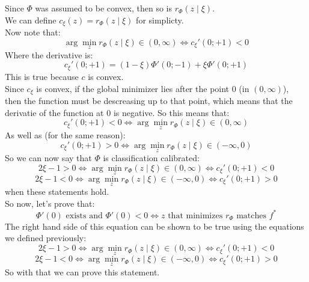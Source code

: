 \documentclass[12pt]{article}
\begin{document}
Since $\Phi$ was assumed to be convex,
then so is $r_\Phi(z \mid \xi)$. \\
We can define $c_\xi(z) = r_\Phi(z \mid \xi)$
for simplicty. \\

Now note that:
\[ \arg \min_z r_\Phi(z \mid \xi) \in (0, \infty)
\iff c_\xi'(0; +1) < 0 \]
Where the derivative is:
\[ c_\xi'(0; +1) 
= (1-\xi)\Phi'(0; -1) + \xi\Phi'(0; +1)\] 
This is true because $c$ is convex. \\
Since $c_\xi$ is convex,
if the global minimizer lies after the point $0$
(in $(0, \infty)$),
then the function must be descreasing
up to that point,
which means that the derivatie of the function
at $0$ is negative.
So this means that:
\[ c_\xi'(0; +1) < 0\iff 
\arg \min_z r_\Phi(z \mid \xi) \in (0, \infty) \]
As well as (for the same reason):
\[ c_\xi'(0; +1) > 0 \iff 
\arg \min_z r_\Phi(z \mid \xi) \in (-\infty, 0) \]
So we can now say that $\Phi$ is classification
calibrated:
\[ 2\xi - 1 > 0 \iff 
\arg \min_z r_\Phi(z \mid \xi) \in (0, \infty)
\iff c_\xi'(0; +1) < 0 \]
\[ 2\xi - 1 < 0 \iff 
\arg \min_z r_\Phi(z \mid \xi) \in (-\infty, 0)
\iff c_\xi'(0; +1) > 0 \]
when these statements hold. \\

So now, let's prove that:
\[ \Phi'(0) \text{ exists and } \Phi'(0) < 0
\iff z \text{ that minimizes } r_\Phi 
\text{ matches } f^* \]
The right hand side of this equation can be
shown to be true using the equations we defined previously:
\[ 2\xi - 1 > 0 \iff 
\arg \min_z r_\Phi(z \mid \xi) \in (0, \infty)
\iff c_\xi'(0; +1) < 0 \]
\[ 2\xi - 1 < 0 \iff 
\arg \min_z r_\Phi(z \mid \xi) \in (-\infty, 0)
\iff c_\xi'(0; +1) > 0 \]
So with that we can prove this statement. \\
\end{document}
